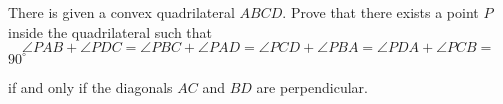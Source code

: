 There is given a convex quadrilateral $ ABCD$. Prove that there exists a point $ P$ inside the quadrilateral such that$\quad \angle PAB + \angle PDC = \angle PBC + \angle PAD = \angle PCD + \angle PBA = \angle PDA + \angle PCB =$ $ 90^{\circ}$

if and only if the diagonals $ AC$ and $ BD$ are perpendicular.